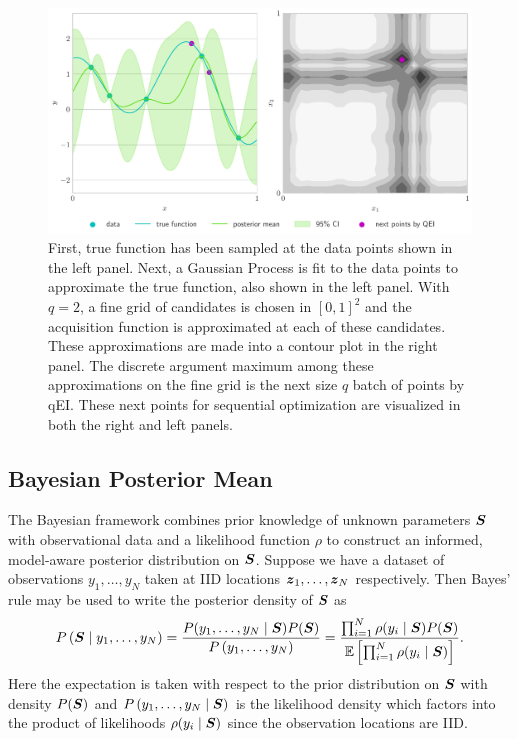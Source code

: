 \documentclass{article}[12pt]
\begin{document}
\begin{figure}[H]
    \centering
    \includegraphics[width=\textwidth]{figs/gp.pdf}
    \caption{First, true function has been sampled at the data points shown in the left panel. Next, a Gaussian Process is fit to the data points to approximate the true function, also shown in the left panel. With $q=2$, a fine grid of candidates is chosen in $[0,1]^{2}$ and the acquisition function is approximated at each of these candidates. These approximations are made into a contour plot in the right panel. The discrete argument maximum among these approximations on the fine grid is the next size $q$ batch of points by qEI. These next points for sequential optimization are visualized in both the right and left panels. }
    \label{fig:bo_qei}
\end{figure}

\subsection{Bayesian Posterior Mean}

The Bayesian framework combines prior knowledge of unknown parameters $\boldsymbol{S}$ with observational data and a likelihood function $\rho$ to construct an informed, model-aware posterior distribution on $\boldsymbol{S}$. Suppose we have a dataset of observations $y_1,\dots,y_{N}$ taken at IID locations $\boldsymbol{z}_1,\dots,\boldsymbol{z}_{N}$ respectively. Then Bayes' rule may be used to write the posterior density of $\boldsymbol{S}$ as 
$$P\left(\boldsymbol{S} \mid y_1,\dots,y_{N}\right) = \frac{P(y_1,\dots,y_{N} \mid \boldsymbol{S}) P(\boldsymbol{S})}{P\left(y_1,\dots,y_{N}\right)} = \frac{\prod_{i=1}^{N} \rho(y_i \mid \boldsymbol{S}) P(\boldsymbol{S})}{\mathbb{E}\left[\prod_{i=1}^{N} \rho(y_i \mid \boldsymbol{S})\right]}.$$
Here the expectation is taken with respect to the prior distribution on $\boldsymbol{S}$ with density $P(\boldsymbol{S})$ and $P\left(y_1,\dots,y_{N} \mid \boldsymbol{S} \right)$ is the likelihood density which factors into the product of likelihoods $\rho(y_i \mid \boldsymbol{S})$ since the observation locations are IID. 
\end{document}
